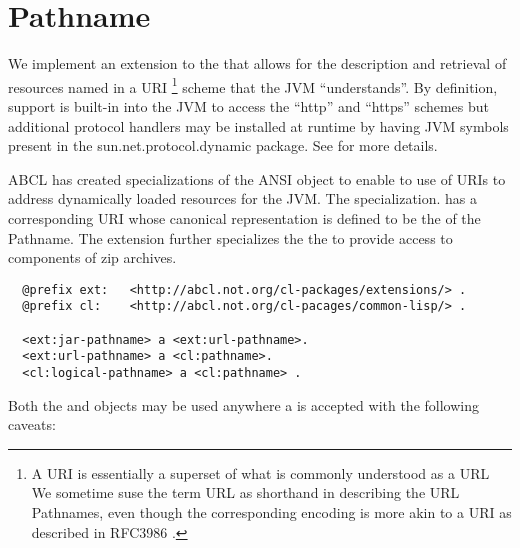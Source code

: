\documentclass[10pt]{book}
\begin{document}
\section{Pathname}

We implement an extension to the  that allows for
the description and retrieval of resources named in a
\textsc{URI} \footnote{A \textsc{URI} is essentially a superset of
  what is commonly understood as a \textsc{URL} We sometime suse the
  term URL as shorthand in describing the URL Pathnames, even though
  the corresponding encoding is more akin to a URI as described in
  RFC3986 \cite{rfc3986}.}  scheme that the \textsc{JVM}
``understands''.  By definition, support is built-in into the JVM to
access the ``http'' and ``https'' schemes but additional protocol
handlers may be installed at runtime by having \textsc{JVM} symbols
present in the sun.net.protocol.dynamic package. See \cite{maso2000}
for more details.

\textsc{ABCL} has created specializations of the ANSI
 object to enable to use of \textsc{URI}s to address
dynamically loaded resources for the JVM.  The 
specialization. has a corresponding \textsc{URI} whose canonical
representation is defined to be the  of the
Pathname. The  extension further specializes
the the  to provide access to components of zip
archives.  

\begin{verbatim}
  @prefix ext:   <http://abcl.not.org/cl-packages/extensions/> .
  @prefix cl:    <http://abcl.not.org/cl-pacages/common-lisp/> .
  
  <ext:jar-pathname> a <ext:url-pathname>.
  <ext:url-pathname> a <cl:pathname>.
  <cl:logical-pathname> a <cl:pathname> .
\end{verbatim}

\label{EXTENSIONS:URL-PATHNAME}

\label{EXTENSIONS:JAR-PATHNAME}

Both the  and  objects
may be used anywhere a  is accepted with the
following caveats:
\end{document}
